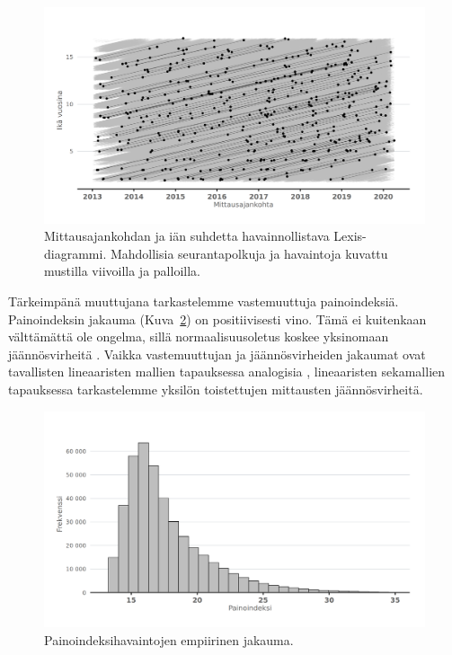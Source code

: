 \documentclass[finnish]{docopts}
\begin{document}
\begin{figure}[H]
\centering
  \includegraphics[scale=0.8]{kuvaajat/lex_plot.png}
  \caption{Mittausajankohdan ja iän suhdetta havainnollistava Lexis-diagrammi. Mahdollisia seurantapolkuja ja havaintoja kuvattu mustilla viivoilla ja palloilla.}
  \label{fig:lexisplot}
\end{figure}

Tärkeimpänä muuttujana tarkastelemme vastemuuttuja painoindeksiä. Painoindeksin jakauma (Kuva~\ref{fig:bmi_dens}) on positiivisesti vino. Tämä ei kuitenkaan välttämättä ole ongelma, sillä normaalisuusoletus koskee yksinomaan jäännösvirheitä \citep{west14}. Vaikka vastemuuttujan ja jäännösvirheiden jakaumat ovat tavallisten lineaaristen mallien tapauksessa analogisia \citep{fitzmaurice11}, lineaaristen sekamallien tapauksessa tarkastelemme yksilön toistettujen mittausten jäännösvirheitä.\\

\begin{figure}[ht]
\centering
  \includegraphics[scale=0.8]{kuvaajat/bmi_dens.png}
  \caption{Painoindeksihavaintojen empiirinen jakauma.}
  \label{fig:bmi_dens}
\end{figure}
\end{document}
